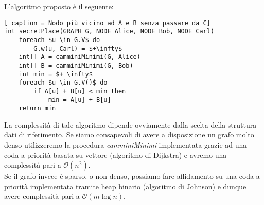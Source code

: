\documentclass[../cheatSheetAlgoritmi.tex]{subfiles}
\begin{document}
L'algoritmo proposto è il seguente: 
\begin{lstlisting}[ caption = Nodo più vicino ad A e B senza passare da C]
int secretPlace(GRAPH G, NODE Alice, NODE Bob, NODE Carl)
	foreach $u \in G.V$ do
		G.w(u, Carl) = $+\infty$
	int[] A = camminiMinimi(G, Alice)
	int[] B = camminiMinimi(G, Bob)
	int min = $+ \infty$
	foreach $u \in G.V()$ do
		if A[u] + B[u] < min then
			min = A[u] + B[u]
	return min
\end{lstlisting}
La complessità di tale algoritmo dipende ovviamente dalla scelta della struttura dati di riferimento. Se siamo consapevoli di avere a disposizione un grafo molto denso utilizzeremo la procedura \emph{camminiMinimi} implementata grazie ad una coda a priorità basata su vettore (algoritmo di Dijkstra) e avremo una complessità pari a $\mathcal{O}(n^2)$. \\
Se il grafo invece è sparso, o non denso, possiamo fare affidamento su una coda a priorità implementata tramite heap binario (algoritmo di Johnson) e dunque avere complessità pari a $\mathcal{O}(m \log n)$.
\end{document}

